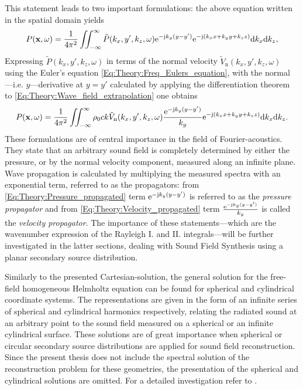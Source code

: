 \vspace{3mm}
This statement leads to two important formulations:
the above equation written in the spatial domain yields
\begin{equation}
P(\mathbf{x},\omega) = \frac{1}{4\pi^2}\iint_{-\infty}^{\infty} \tilde{P}(k_x,y',k_z,\omega) \mathrm{e}^{-\mathrm{j} k_y ( y - y' ) }  \mathrm{e}^{- \mathrm{j} \left( k_x x + k_y y + k_z z \right) }
\mathrm{d} k_x\mathrm{d} k_z,
\label{Eq:Theory:Pressure_propagated}
\end{equation}
Expressing $\tilde{P}(k_x,y',k_z,\omega)$ in terms of the normal velocity $\tilde{V}_{\mathrm{n}}(k_x,y',k_z,\omega)$ using the Euler's equation  \eqref{Eq:Theory:Freq_Eulers_equation}, with the normal ---i.e. $y$---derivative at $y = y'$ calculated by applying the differentiation theorem to \eqref{Eq:Theory:Wave_field_extrapolation} one obtains
\begin{equation}
P(\mathbf{x},\omega) = \frac{1}{4\pi^2}\iint_{-\infty}^{\infty} \rho_0 c k \tilde{V}_{\mathrm{n}}(k_x,y',k_z,\omega) \frac{\mathrm{e}^{-\mathrm{j} k_y ( y - y' ) } }{k_y} \mathrm{e}^{- \mathrm{j} \left( k_x x + k_y y + k_z z \right) }
\mathrm{d} k_x\mathrm{d} k_z.
\label{Eq:Theory:Velocity_propagated}
\end{equation}
These formulations are of central importance in the field of Fourier-acoustics. They state that an arbitrary sound field is completely determined by either the pressure, or by the normal velocity component, measured along an infinite plane. Wave propagation is calculated by multiplying the measured spectra with an exponential term, referred to as the propagators: from \eqref{Eq:Theory:Pressure_propagated} term $\mathrm{e}^{-\mathrm{j} k_y ( y - y' ) }$ is referred to as the \emph{pressure propagator} and from \eqref{Eq:Theory:Velocity_propagated} term $\frac{\mathrm{e}^{-\mathrm{j} k_y ( y - y' ) } }{k_y}$ is called the \emph{velocity propagator}.
The importance of these statements---which are the wavenumber expression of the Rayleigh I. and II. integrals---will be further investigated in the latter sections, dealing with Sound Field Synthesis using a planar secondary source distribution.

\vspace{3mm}
Similarly to the presented Cartesian-solution, the general solution for the free-field homogeneous Helmholtz equation can be found for spherical and cylindrical coordinate systems. The representations are given in the form of an infinite series of spherical and cylindrical harmonics respectively, relating the radiated sound at an arbitrary point to the sound field measured on a spherical or an infinite cylindrical surface. These solutions are of great importance when spherical or circular secondary source distributions are applied for sound field reconstruction. Since the present thesis does not include the spectral solution of the reconstruction problem for these geometries, the presentation of the spherical and cylindrical solutions are omitted. For a detailed investigation refer to \cite{Williams1999, Zotter2009phd, Ahrens2012}.

